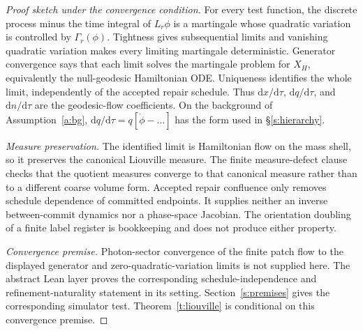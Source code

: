 \documentclass[11pt]{article}
\theoremstyle{remark}
\newcommand{\Dd}{\mathrm{d}}
\begin{document}
\begin{proof}[Proof sketch under the convergence condition]
For every test function, the discrete process minus the time integral of
$L_r\phi$ is a martingale whose quadratic variation is controlled by
$\Gamma_r(\phi)$. Tightness gives subsequential limits and vanishing
quadratic variation makes every limiting martingale deterministic. Generator
convergence says that each limit solves the martingale problem for $X_H$,
equivalently the null-geodesic Hamiltonian ODE. Uniqueness identifies the
whole limit, independently of the accepted repair schedule. Thus
$\Dd x/\Dd\tau$, $\Dd q/\Dd\tau$, and $\Dd\hat n/\Dd\tau$ are the
geodesic-flow coefficients. On the background of Assumption~\ref{a:bg},
$\Dd q/\Dd\tau=q[\dot\phi-\ldots]$ has the form used in
\S\ref{s:hierarchy}.

\emph{Measure preservation.} The identified limit is Hamiltonian flow on the
mass shell, so it preserves the canonical Liouville measure. The finite
measure-defect clause checks that the quotient measures converge to that
canonical measure rather than to a different coarse volume form. Accepted repair confluence
only removes schedule dependence of committed endpoints. It supplies neither
an inverse between-commit dynamics nor a phase-space Jacobian. The
orientation doubling of a finite label register is bookkeeping and does not
produce either property.

\emph{Convergence premise.} Photon-sector convergence of the finite patch flow to
the displayed generator and zero-quadratic-variation limits is not supplied here. The abstract Lean
layer proves the corresponding schedule-independence and refinement-naturality
statement in its setting. Section~\ref{s:premises} gives the corresponding
simulator test. Theorem~\ref{t:liouville} is conditional on this convergence
premise.
\end{proof}
\end{document}
